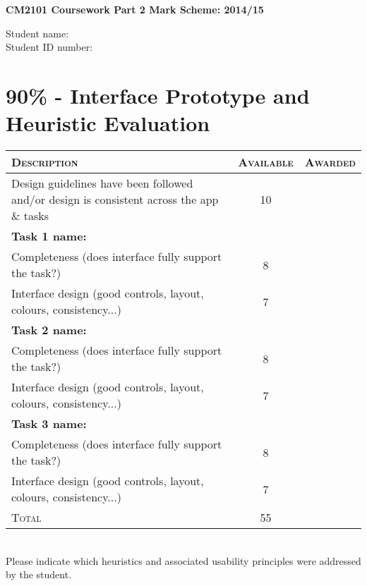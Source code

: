 \documentclass[11pt,a4paper]{report}
\begin{document}
\textbf{CM2101 Coursework Part 2 Mark Scheme: 2014/15}\\
\vskip30pt

\begin{description}
    \item[Student name:]
    \item[Student ID number:]
\end{description}

\section*{90\% - Interface Prototype and Heuristic Evaluation}

\begin{tabular}{p{11cm}|c|c}
    \textsc{Description} & \textsc{Available} & \textsc{Awarded} \\
    \hline
    \hline
    Design guidelines have been followed and/or design is consistent across the app \& tasks & 10 &  \\
    \hline
    \textbf{Task 1 name: } & & \\
    Completeness (does interface fully support the task?)  & 8 & \\
    Interface design (good controls, layout, colours, consistency...) & 7\\
    \hline
    \textbf{Task 2 name: } & & \\
    Completeness (does interface fully support the task?)  & 8 & \\
    Interface design (good controls, layout, colours, consistency...) & 7\\
    \hline
    \textbf{Task 3 name: } & & \\
    Completeness (does interface fully support the task?)  & 8 & \\
    Interface design (good controls, layout, colours, consistency...) & 7\\
    \hline
    \hline
    \textsc{Total} & 55 &
\end{tabular}\\
\vskip15pt
\noindent Please indicate which heuristics and associated usability principles were addressed by the student.\\
\end{document}
